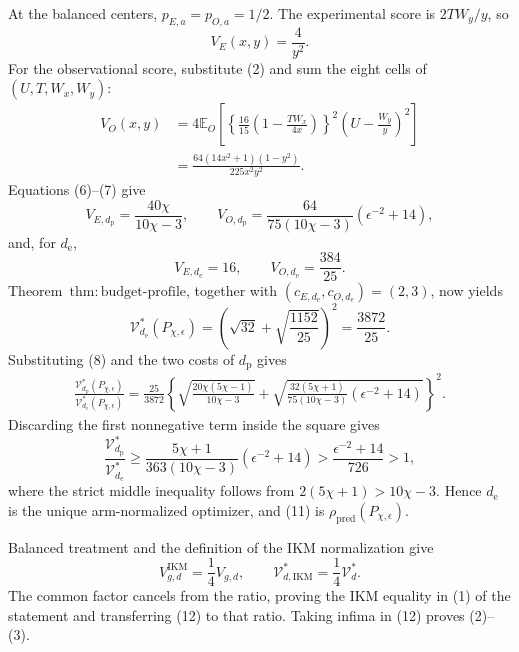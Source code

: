 At the balanced centers, \(p_{E,a}=p_{O,a}=1/2\).  The experimental score is \(2TW_y/y\), so
\[
 V_E(x,y)=\frac4{y^2}.                                   \tag{6}
\]
For the observational score, substitute (2) and sum the eight cells of \((U,T,W_x,W_y)\):
\[
\begin{aligned}
 V_O(x,y)
 &=4\mathbb E_O\!\left[
 \left\{\frac{16}{15}\left(1-\frac{TW_x}{4x}\right)\right\}^2
 \left(U-\frac{W_y}{y}\right)^2\right]\\
 &=\frac{64(14x^2+1)(1-y^2)}{225x^2y^2}.                \tag{7}
\end{aligned}
\]
Equations (6)--(7) give
\[
 V_{E,d_{\mathrm p}}=\frac{40\chi}{10\chi-3},
 \qquad
 V_{O,d_{\mathrm p}}
 =\frac{64}{75(10\chi-3)}(\epsilon^{-2}+14),            \tag{8}
\]
and, for \(d_{\mathrm e}\),
\[
 V_{E,d_{\mathrm e}}=16,
 \qquad
 V_{O,d_{\mathrm e}}=\frac{384}{25}.                    \tag{9}
\]
Theorem~\(\mathrm{thm{:}budget\text{-}profile}\), together with \((c_{E,d_{\mathrm e}},c_{O,d_{\mathrm e}})=(2,3)\), now yields
\[
 \mathcal V_{d_{\mathrm e}}^*(P_{\chi,\epsilon})
 =\left(\sqrt{32}+\sqrt{\frac{1152}{25}}\right)^2
 =\frac{3872}{25}.                                      \tag{10}
\]
Substituting (8) and the two costs of \(d_{\mathrm p}\) gives
\[
\begin{aligned}
 \frac{\mathcal V_{d_{\mathrm p}}^*(P_{\chi,\epsilon})}
 {\mathcal V_{d_{\mathrm e}}^*(P_{\chi,\epsilon})}
 =\frac{25}{3872}\left\{
 \sqrt{\frac{20\chi(5\chi-1)}{10\chi-3}}
 +\sqrt{\frac{32(5\chi+1)}{75(10\chi-3)}
 (\epsilon^{-2}+14)}\right\}^2.                        \tag{11}
\end{aligned}
\]
Discarding the first nonnegative term inside the square gives
\[
 \frac{\mathcal V_{d_{\mathrm p}}^*}{\mathcal V_{d_{\mathrm e}}^*}
 \ge\frac{5\chi+1}{363(10\chi-3)}(\epsilon^{-2}+14)
 >\frac{\epsilon^{-2}+14}{726}>1,                       \tag{12}
\]
where the strict middle inequality follows from \(2(5\chi+1)>10\chi-3\).  Hence \(d_{\mathrm e}\) is the unique arm-normalized optimizer, and (11) is \(\rho_{\mathrm{pred}}(P_{\chi,\epsilon})\).

Balanced treatment and the definition of the IKM normalization give
\[
 V_{g,d}^{\mathrm{IKM}}=\frac14V_{g,d},
 \qquad
 \mathcal V_{d,\mathrm{IKM}}^*=\frac14\mathcal V_d^*.
\]
The common factor cancels from the ratio, proving the IKM equality in (1) of the statement and transferring (12) to that ratio.  Taking infima in (12) proves (2)--(3).

